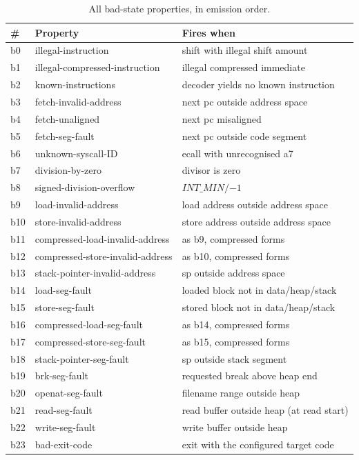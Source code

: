 \documentclass[sigplan,screen,nonacm]{acmart}
\begin{document}
\begin{table}[h]
\caption{All bad-state properties, in emission order.}
\label{tab:props}
\centering
\scriptsize
\setlength{\tabcolsep}{3pt}%
\begin{tabular}{lll}
\toprule
\# & Property & Fires when \\
\midrule
b0 & illegal-instruction & shift with illegal shift amount \\
b1 & illegal-compressed-instruction & illegal compressed immediate \\
b2 & known-instructions & decoder yields no known instruction \\
b3 & fetch-invalid-address & next pc outside address space \\
b4 & fetch-unaligned & next pc misaligned \\
b5 & fetch-seg-fault & next pc outside code segment \\
b6 & unknown-syscall-ID & ecall with unrecognised a7 \\
b7 & division-by-zero & divisor is zero \\
b8 & signed-division-overflow & $\mathit{INT\_MIN} /{-1}$ \\
b9 & load-invalid-address & load address outside address space \\
b10 & store-invalid-address & store address outside address space \\
b11 & compressed-load-invalid-address & as b9, compressed forms \\
b12 & compressed-store-invalid-address & as b10, compressed forms \\
b13 & stack-pointer-invalid-address & sp outside address space \\
b14 & load-seg-fault & loaded block not in data/heap/stack \\
b15 & store-seg-fault & stored block not in data/heap/stack \\
b16 & compressed-load-seg-fault & as b14, compressed forms \\
b17 & compressed-store-seg-fault & as b15, compressed forms \\
b18 & stack-pointer-seg-fault & sp outside stack segment \\
b19 & brk-seg-fault & requested break above heap end \\
b20 & openat-seg-fault & filename range outside heap \\
b21 & read-seg-fault & read buffer outside heap (at read start) \\
b22 & write-seg-fault & write buffer outside heap \\
b23 & bad-exit-code & exit with the configured target code \\
\bottomrule
\end{tabular}
\end{table}
\end{document}
